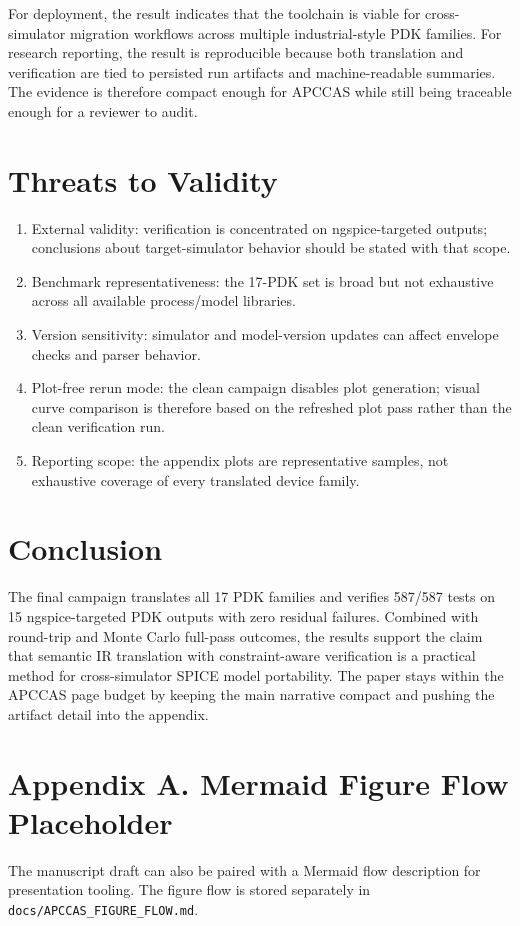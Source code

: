 \documentclass[10pt,twocolumn,a4paper]{article}
\begin{document}
For deployment, the result indicates that the toolchain is viable for cross-simulator migration workflows across multiple industrial-style PDK families. For research reporting, the result is reproducible because both translation and verification are tied to persisted run artifacts and machine-readable summaries. The evidence is therefore compact enough for APCCAS while still being traceable enough for a reviewer to audit.

\section{Threats to Validity}
\begin{enumerate}
    \item External validity: verification is concentrated on ngspice-targeted outputs; conclusions about target-simulator behavior should be stated with that scope.
    \item Benchmark representativeness: the 17-PDK set is broad but not exhaustive across all available process/model libraries.
    \item Version sensitivity: simulator and model-version updates can affect envelope checks and parser behavior.
    \item Plot-free rerun mode: the clean campaign disables plot generation; visual curve comparison is therefore based on the refreshed plot pass rather than the clean verification run.
    \item Reporting scope: the appendix plots are representative samples, not exhaustive coverage of every translated device family.
\end{enumerate}

\section{Conclusion}
The final campaign translates all 17 PDK families and verifies 587/587 tests on 15 ngspice-targeted PDK outputs with zero residual failures. Combined with round-trip and Monte Carlo full-pass outcomes, the results support the claim that semantic IR translation with constraint-aware verification is a practical method for cross-simulator SPICE model portability. The paper stays within the APCCAS page budget by keeping the main narrative compact and pushing the artifact detail into the appendix.

\section*{Appendix A. Mermaid Figure Flow Placeholder}
The manuscript draft can also be paired with a Mermaid flow description for presentation tooling. The figure flow is stored separately in \texttt{docs/APCCAS\_FIGURE\_FLOW.md}.
\end{document}
